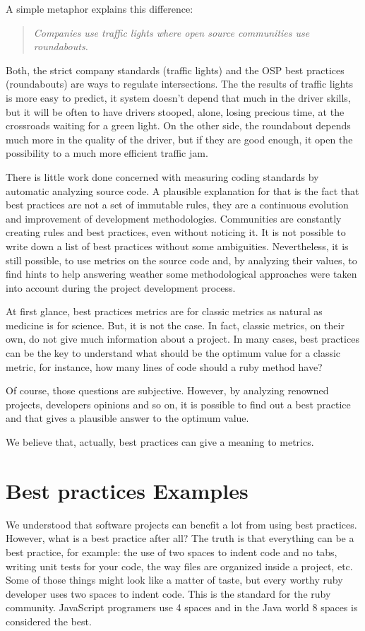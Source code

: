 A simple metaphor explains this difference:
\begin{quote}\emph{
  Companies use traffic lights where open source communities use roundabouts.
}\end{quote}

Both, the strict company standards (traffic lights) and the OSP best practices (roundabouts) are ways to regulate intersections.
The the results of traffic lights is more easy to predict, it system doesn't depend that much in the driver skills,
but it will be often to have drivers stooped, alone, losing precious time, at the crossroads waiting for a green light.
On the other side, the roundabout depends much more in the quality of the driver, 
but if they are good enough, it open the possibility to a much more efficient traffic jam.


There is little work done concerned with measuring coding standards by automatic analyzing source code.
A plausible explanation for that is the fact that best practices are not a set of immutable rules,
they are a continuous evolution and improvement of development methodologies.
Communities are constantly creating rules and best practices, even without noticing it.
It is not possible to write down a list of best practices without some ambiguities.
Nevertheless, it is still possible, to use metrics on the source code and, by analyzing their values,
to find hints to help answering weather some methodological approaches
were taken into account during the project development process.

At first glance, best practices metrics are for classic metrics as natural as medicine is for science.
But, it is not the case.
In fact, classic metrics, on their own, do not give much information about a project.
In many cases, best practices can be the key to understand what should be the optimum value for a classic metric,
for instance, how many lines of code should a ruby method have?

Of course, those questions are subjective.
However, by analyzing renowned projects, developers opinions and so on, it is possible to find out a best practice
and that gives a plausible answer to the optimum value.

We believe that, actually, best practices can give a meaning to metrics.



\section{Best practices Examples} \label{sec:best_practices_examples}
We understood that software projects can benefit a lot from using best practices.
However, what is a best practice after all?
The truth is that everything can be a best practice, for example:
the use of two spaces to indent code and no tabs, 
writing unit tests for your code,
the way files are organized inside a project, etc.
Some of those things might look like a matter of taste,
but every worthy ruby developer uses two spaces to indent code.
This is the standard for the ruby community.
JavaScript programers use 4 spaces
and in the Java world 8 spaces is considered the best.

